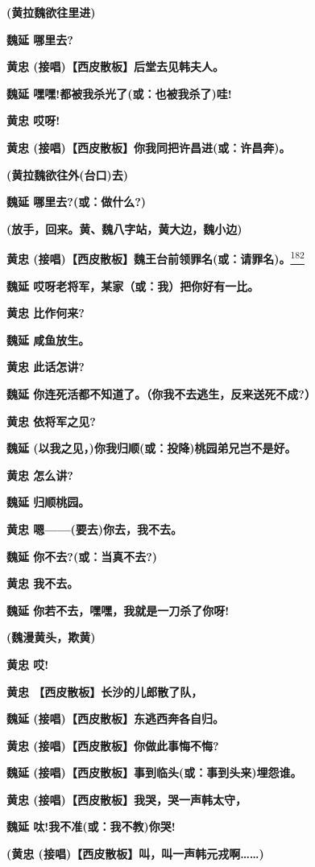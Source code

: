 \textbf{(黄拉魏欲往里进)}

\textbf{魏延 哪里去?}

\textbf{黄忠 (接唱)【西皮散板】后堂去见韩夫人。}

\textbf{魏延 嘿嘿!都被我杀光了(或：也被我杀了)哇!}

\textbf{黄忠 哎呀!}

\textbf{黄忠 (接唱)【西皮散板】你我同把许昌进(或：许昌奔)。}

\textbf{(黄拉魏欲往外(台口)去)}

\textbf{魏延 哪里去?(或：做什么?)}

\textbf{(放手，回来。黄、魏八字站，黄大边，魏小边)}

\textbf{黄忠
(接唱)【西皮散板】魏王台前{领罪名}(或：请罪名)。}\protect\hyperlink{fn182}{\textsuperscript{182}}

\textbf{魏延 哎呀老将军，某家（或：我）把你好有一比。}

\textbf{黄忠 比作何来?}

\textbf{魏延 咸鱼放生。}

\textbf{黄忠 此话怎讲?}

\textbf{魏延 你连死活都不知道了。（你我不去逃生，反来送死不成?）}

\textbf{黄忠 依将军之见?}

\textbf{魏延 (以我之见，)你我{归顺}(或：投降)桃园弟兄岂不是好。}

\textbf{黄忠 怎么讲?}

\textbf{魏延 归顺桃园。}

\textbf{黄忠 嗯------(要去)你去，我不去。}

\textbf{魏延 你不去?(或：当真不去?)}

\textbf{黄忠 我不去。}

\textbf{魏延 你若不去，嘿嘿，我就是一刀杀了你呀!}

\textbf{(魏漫黄头，欺黄)}

\textbf{黄忠 哎!}

\textbf{黄忠 【西皮散板】长沙的儿郎散了队，}

\textbf{魏延 (接唱)【西皮散板】东逃西奔各自归。}

\textbf{黄忠 (接唱)【西皮散板】你做此事悔不悔?}

\textbf{魏延 (接唱)【西皮散板】事到临头(或：事到头来)埋怨谁。}

\textbf{黄忠 (接唱)【西皮散板】我哭，哭一声韩太守，}

\textbf{魏延 呔!我不准(或：我不教)你哭!}

\textbf{(黄忠 (接唱)【西皮散板】叫，叫一声韩元戎啊\ldots{}\ldots{})}

